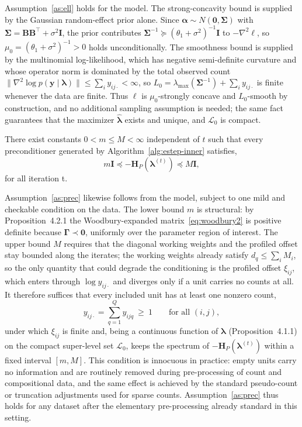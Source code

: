 Assumption~\ref{as:ell} holds for the model. The strong-concavity bound is supplied by
the Gaussian random-effect prior alone. Since $\bm{\alpha}\sim N(\mathbf 0,\bm{\Sigma})$ with
$\bm{\Sigma}=\mathbf{B}\mathbf{B}^{\top}+\sigma^{2}\mathbf{I}$, the prior contributes
$\bm{\Sigma}^{-1}\succeq(\theta_{1}+\sigma^{2})^{-1}\mathbf{I}$ to $-\nabla^{2}\ell$, so
$\mu_{0}=(\theta_{1}+\sigma^{2})^{-1}>0$ holds unconditionally.
The smoothness bound is supplied by the multinomial log-likelihood, which has
negative semi-definite curvature and whose operator norm is dominated by the total observed count
$\bigl\lVert\nabla^{2}\log p(\bm{y}\mid\bm{\lambda})\bigr\rVert\le\sum_{i}y_{ij\cdot}<\infty$, so
$L_{0}=\lambda_{\max}(\bm{\Sigma}^{-1})+\sum_{i}y_{ij\cdot}$ is finite whenever the data are finite.
Thus $\ell$ is $\mu_{0}$-strongly concave and $L_{0}$-smooth by construction, and no additional
sampling assumption is needed; the same fact guarantees that the maximizer $\hat{\bm{\lambda}}$
exists and unique, and $\mathcal{L}_{0}$ is compact.

\begin{assumption}
    There exist constants $0<m\leq M<\infty$ independent of $t$ such that every preconditioner generated by Algorithm~\ref{alg:estep-inner} satisfies,
    \begin{equation}
        m\mathbf{I}\preceq -\mathbf{H}_{P}(\bm{\lambda}^{(t)})\preceq M\mathbf{I},
    \end{equation}
    for all iteration t.
    \label{as:prec}
\end{assumption}
Assumption~\ref{as:prec} likewise follows from the model, subject to one mild and checkable
condition on the data. The lower bound $m$ is structural: by Proposition~4.2.1 the
Woodbury-expanded matrix~\eqref{eq:woodbury2} is positive definite because $\bm{\Gamma}\prec\mathbf 0$,
uniformly over the parameter region of interest. The upper bound $M$ requires that the diagonal
working weights and the profiled offset stay bounded along the iterates; the working weights
already satisfy $d_{q}\le\sum_{i}M_{i}$, so the only quantity that could degrade the conditioning
is the profiled offset $\xi_{ij}$, which enters through $\log y_{ij\cdot}$ and diverges only if a
unit carries no counts at all. It therefore suffices that every included unit has at least one
nonzero count,
\[
y_{ij\cdot}=\sum_{q=1}^{Q}y_{ijq}\ \ge\ 1\qquad\text{for all }(i,j),
\]
under which $\xi_{ij}$ is finite and, being a continuous function of $\bm{\lambda}$
(Proposition~4.1.1) on the compact super-level set $\mathcal{L}_{0}$, keeps the spectrum of
$-\mathbf{H}_{P}(\bm{\lambda}^{(t)})$ within a fixed interval $[m,M]$. This condition is innocuous
in practice: empty units carry no information and are routinely removed during pre-processing of
count and compositional data, and the same effect is achieved by the standard pseudo-count or
truncation adjustments used for sparse counts. Assumption~\ref{as:prec} thus holds for any dataset
after the elementary pre-processing already standard in this setting.
    
